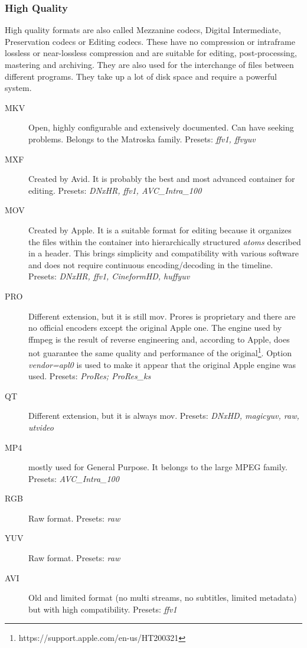 \subsubsection{High Quality}
\label{ssub:ffmpeg_video_high_quality}

High quality formats are also called Mezzanine codecs, Digital Intermediate, Preservation codecs or Editing codecs. These  have no compression or intraframe lossless or near-lossless compression and are suitable for editing, post-processing, mastering and archiving. They are also used for the interchange of files between different programs. They take up a lot of disk space and require a powerful system.

\begin{description}
	\item[MKV] Open, highly configurable and extensively documented. Can have seeking problems. Belongs to the Matroska family.
	\newline    Presets: \textit{ffv1, ffvyuv}
	\item[MXF] Created by Avid. It is probably the best and most advanced container for editing.
	\newline    Presets: \textit{DNxHR, ffv1, AVC\_Intra\_100}
	\item[MOV] Created by Apple. It is a suitable format for editing because it organizes the files within the container into hierarchically structured \textit{atoms} described in a header. This brings simplicity and compatibility with various software and does not require continuous encoding/decoding in the timeline.
	\newline    Presets: \textit{DNxHR, ffv1, CineformHD, huffyuv}
	\item[PRO] Different extension, but it is still mov. Prores is proprietary and there are no official encoders except the original Apple one. The engine used by ffmpeg is the result of reverse engineering and, according to Apple, does not guarantee the same quality and performance of the original\protect\footnote{https://support.apple.com/en-us/HT200321}. Option \textit{vendor=apl0} is used to make it appear that the original Apple engine was used.
	\newline    Presets: \textit{ProRes; ProRes\_ks}
	\item[QT] Different extension, but it is always mov.
	\newline    Presets: \textit{DNxHD, magicyuv, raw, utvideo}
	\item[MP4] mostly used for General Purpose. It belongs to the large MPEG family.
	\newline    Presets: \textit{AVC\_Intra\_100}
	\item[RGB] Raw format.
	\newline    Presets: \textit{raw}
	\item[YUV] Raw format.
	\newline    Presets: \textit{raw}
	\item[AVI] Old and limited format (no multi streams, no subtitles, limited metadata) but with high compatibility.
	\newline    Presets: \textit{ffv1}
\end{description}

